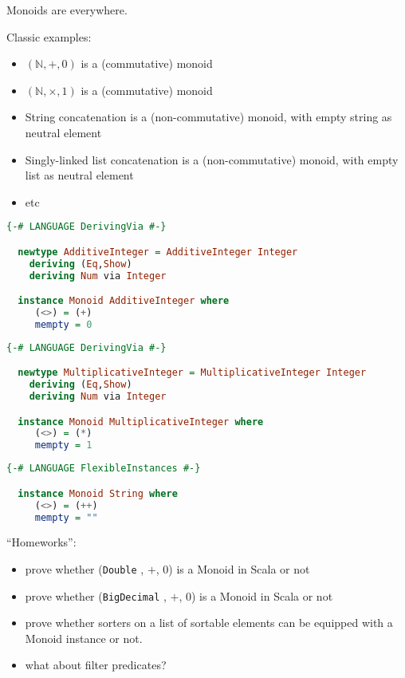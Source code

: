 \documentclass[10pt]{beamer}
\providecommand{\N}{\mathbb{N}}
\begin{document}
\begin{frame}
  Monoids are everywhere.

  Classic examples:
  \begin{itemize}
    \item $(\N, +, 0)$ is a (commutative) monoid
    \item $(\N, \times , 1)$ is a (commutative) monoid
    \item String concatenation is a (non-commutative) monoid, with empty string as neutral element
    \item Singly-linked list concatenation is a (non-commutative) monoid, with empty list as neutral element
    \item etc
  \end{itemize}
\end{frame}


\begin{frame}[fragile]
  \begin{lstlisting}[language=haskell]
  {-# LANGUAGE DerivingVia #-}

  newtype AdditiveInteger = AdditiveInteger Integer
    deriving (Eq,Show)
    deriving Num via Integer

  instance Monoid AdditiveInteger where
     (<>) = (+)
     mempty = 0
  \end{lstlisting}
\end{frame}
\begin{frame}[fragile]
  \begin{lstlisting}[language=haskell]
  {-# LANGUAGE DerivingVia #-}

  newtype MultiplicativeInteger = MultiplicativeInteger Integer
    deriving (Eq,Show)
    deriving Num via Integer

  instance Monoid MultiplicativeInteger where
     (<>) = (*)
     mempty = 1
  \end{lstlisting}
\end{frame}

\begin{frame}[fragile]
  \begin{lstlisting}[language=haskell]
  {-# LANGUAGE FlexibleInstances #-}

  instance Monoid String where
     (<>) = (++)
     mempty = ""
  \end{lstlisting}
\end{frame}

\begin{frame}[fragile]
  ``Homeworks'':
  \begin{itemize}
    \item prove whether (\verb|Double| , $+$, $0$) is a Monoid in Scala or not
    \item prove whether (\verb|BigDecimal| , $+$, $0$) is a Monoid in Scala or not
    \item prove whether sorters on a list of sortable elements can be equipped with a Monoid instance or not.
    \item what about filter predicates?
  \end{itemize}
\end{frame}
\end{document}
